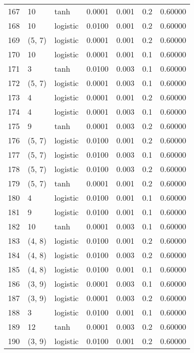 \begin{tabular}{lllrrrr}
167 &          10 &      tanh &  0.0001 &  0.001 &  0.2 &   0.60000 \\
168 &          10 &  logistic &  0.0100 &  0.001 &  0.2 &   0.60000 \\
169 &      (5, 7) &  logistic &  0.0001 &  0.001 &  0.2 &   0.60000 \\
170 &          10 &  logistic &  0.0001 &  0.001 &  0.1 &   0.60000 \\
171 &           3 &      tanh &  0.0100 &  0.003 &  0.1 &   0.60000 \\
172 &      (5, 7) &  logistic &  0.0001 &  0.003 &  0.1 &   0.60000 \\
173 &           4 &  logistic &  0.0001 &  0.001 &  0.2 &   0.60000 \\
174 &           4 &  logistic &  0.0001 &  0.003 &  0.1 &   0.60000 \\
175 &           9 &      tanh &  0.0001 &  0.003 &  0.2 &   0.60000 \\
176 &      (5, 7) &  logistic &  0.0100 &  0.001 &  0.2 &   0.60000 \\
177 &      (5, 7) &  logistic &  0.0100 &  0.003 &  0.1 &   0.60000 \\
178 &      (5, 7) &  logistic &  0.0100 &  0.003 &  0.2 &   0.60000 \\
179 &      (5, 7) &      tanh &  0.0001 &  0.001 &  0.2 &   0.60000 \\
180 &           4 &  logistic &  0.0100 &  0.001 &  0.1 &   0.60000 \\
181 &           9 &  logistic &  0.0100 &  0.001 &  0.1 &   0.60000 \\
182 &          10 &      tanh &  0.0001 &  0.003 &  0.1 &   0.60000 \\
183 &      (4, 8) &  logistic &  0.0100 &  0.001 &  0.2 &   0.60000 \\
184 &      (4, 8) &  logistic &  0.0100 &  0.003 &  0.2 &   0.60000 \\
185 &      (4, 8) &  logistic &  0.0100 &  0.001 &  0.1 &   0.60000 \\
186 &      (3, 9) &  logistic &  0.0001 &  0.003 &  0.1 &   0.60000 \\
187 &      (3, 9) &  logistic &  0.0001 &  0.003 &  0.2 &   0.60000 \\
188 &           3 &  logistic &  0.0100 &  0.001 &  0.1 &   0.60000 \\
189 &          12 &      tanh &  0.0001 &  0.003 &  0.2 &   0.60000 \\
190 &      (3, 9) &  logistic &  0.0100 &  0.001 &  0.2 &   0.60000 \\

\end{tabular}
